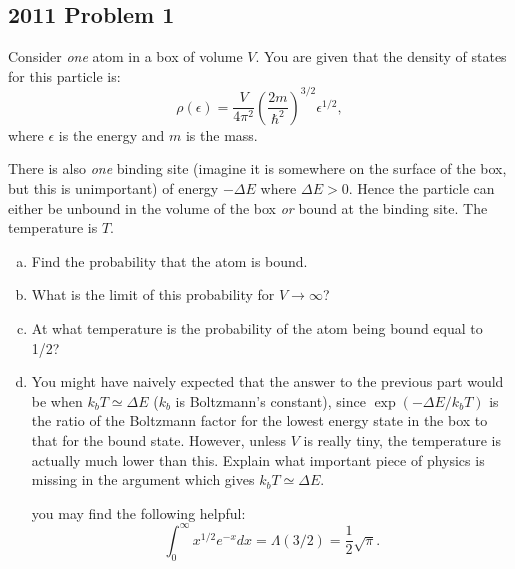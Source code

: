 

	
	\subsection{2011 Problem 1}
	Consider \textit{one} atom in a box of volume $ V $.  You are given that the density of states for this particle is:
	\begin{equation*}
		\rho(\epsilon) = \frac{V}{4\pi^2}\left(\frac{2m}{\hbar^2}\right)^{3/2}\epsilon^{1/2},
	\end{equation*}
	where $ \epsilon $ is the energy and $ m $ is the mass.
	
	There is also \textit{one} binding site (imagine it is somewhere on the surface of the box, but this is unimportant) of energy $ - \Delta E $ where $ \Delta E > 0 $.  Hence the particle can either be unbound in the volume of the box \textit{or} bound at the binding site.  The temperature is $ T $.
	\begin{enumerate}[(a)]
		\item Find the probability that the atom is bound.
		\item What is the limit of this probability for $ V \to \infty $?
		\item At what temperature is the probability of the atom being bound equal to 1/2?
		\item You might have naively expected that the answer to the previous part would be when $ k_b T \simeq \Delta E $ ($ k_b $ is Boltzmann's constant), since $ \exp(-\Delta E/k_b T) $ is the ratio of the Boltzmann factor for the lowest energy state in the box to that for the bound state.  However, unless $ V $ is really tiny, the temperature is actually much lower than this.  Explain what important piece of physics is missing in the argument which gives $ k_b T \simeq \Delta E $.
		
		you may find the following helpful:
		\begin{equation*}
			\int_{0}^{\infty} x^{1/2}e^{-x}dx = \Lambda(3/2) = \frac{1}{2}\sqrt{\pi}.
		\end{equation*}
	\end{enumerate} 
